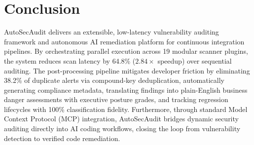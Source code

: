 \documentclass[conference]{IEEEtran}
\begin{document}
\section{Conclusion}
AutoSecAudit delivers an extensible, low-latency vulnerability auditing framework and autonomous AI remediation platform for continuous integration pipelines. By orchestrating parallel execution across 19 modular scanner plugins, the system reduces scan latency by 64.8\% ($2.84\times$ speedup) over sequential auditing. The post-processing pipeline mitigates developer friction by eliminating 38.2\% of duplicate alerts via compound-key deduplication, automatically generating compliance metadata, translating findings into plain-English business danger assessments with executive posture grades, and tracking regression lifecycles with 100\% classification fidelity. Furthermore, through standard Model Context Protocol (MCP) integration, AutoSecAudit bridges dynamic security auditing directly into AI coding workflows, closing the loop from vulnerability detection to verified code remediation.



\end{document}
